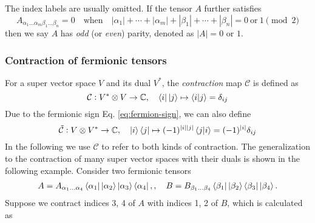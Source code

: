 \documentclass[11pt]{article}
\begin{document}
The index labels are usually omitted. If the tensor $A$ further satisfies
\begin{equation}
    A_{\alpha_1 ... \alpha_m \beta_1 ... \beta_n}
    = 0 \quad \text{when} \quad
    |\alpha_1| + \cdots + |\alpha_m|
    + |\beta_1| + \cdots + |\beta_n|
    = 0 \ \text{or} \ 1 \pmod{2}
\end{equation}
then we say $A$ has \emph{odd} (or \emph{even}) parity, denoted as $|A| = 0$ or $1$. 

\subsubsection{Contraction of fermionic tensors}

For a super vector space $V$ and its dual $V^*$, the \emph{contraction} map $\mathcal{C}$ is defined as
\begin{equation}
    \mathcal{C}:  
    V^* \otimes V \to \mathbb{C}, \quad
    \bra{i} \ket{j}
    \mapsto \braket{i|j} = \delta_{ij}
    \label{eq:contraction}
\end{equation}
Due to the fermionic sign Eq. \eqref{eq:fermion-sign}, we can also define
\begin{equation}
    \tilde{\mathcal{C}}: 
    V \otimes V^* \to \mathbb{C}, \quad
    \ket{i} \bra{j}
    \mapsto (-1)^{|i||j|} \braket{j|i}
    = (-1)^{|i|} \delta_{ij}
    \label{eq:contraction2}
\end{equation}
In the following we use $\mathcal{C}$ to refer to both kinds of contraction. The generalization to the contraction of many super vector spaces with their duals is shown in the following example. 
Consider two fermionic tensors
\begin{equation}
\begin{aligned}
    A = A_{\alpha_1 ... \alpha_4}
    \bra{\alpha_1} \ket{\alpha_2}
    \ket{\alpha_3} \bra{\alpha_4},
    , \quad
    B = B_{\beta_1 ... \beta_4}
    \bra{\beta_1} \ket{\beta_2}
    \bra{\beta_3} \ket{\beta_4}.
\end{aligned}
\end{equation}
Suppose we contract indices 3, 4 of $A$ with indices 1, 2 of $B$, which is calculated as
\end{document}
